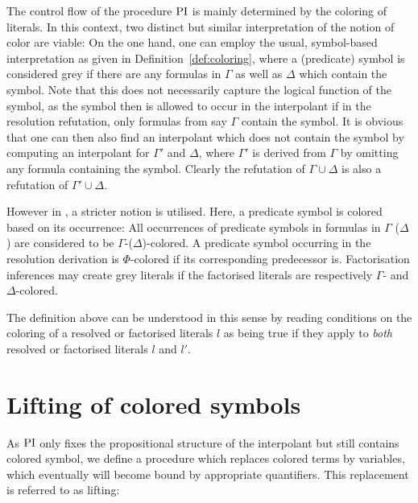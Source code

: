 \begin{remark}
	The control flow of the procedure $\operatorname{PI}$ is mainly determined by the coloring of literals.
	In this context, two distinct but similar interpretation of the notion of color are viable: 
	On the one hand, one can employ the usual, symbol-based interpretation as given in Definition~\ref{def:coloring}, where a (predicate) symbol is considered grey if there are any formulas in $\Gamma$ as well as $\Delta$ which contain the symbol. 
	Note that this does not necessarily capture the logical function of the symbol, as the symbol then is allowed to occur in the interpolant if in the resolution refutation, only formulas from say $\Gamma$ contain the symbol.
	It is obvious that one can then also find an interpolant which does not contain the symbol by computing an interpolant for $\Gamma'$ and $\Delta$, where $\Gamma'$ is derived from $\Gamma$ by omitting any formula containing the symbol. 
	Clearly the refutation of $\Gamma \cup \Delta$ is also a refutation of $\Gamma' \cup \Delta$.

	However in \cite{Huang95}, a stricter notion is utilised.
	Here, a predicate symbol is colored based on its occurrence:
	All occurrences of predicate symbols in formulas in $\Gamma$ ($\Delta$) are considered to be $\Gamma$-($\Delta$)-colored.
	A predicate symbol occurring in the resolution derivation is $\Phi$-colored if its corresponding predecessor is.
	Factorisation inferences may create grey literals if the factorised literals are respectively $\Gamma$- and $\Delta$-colored.

	The definition above can be understood in this sense by reading conditions on the coloring of a resolved or factorised literals $l$ as being true if they apply to \emph{both} resolved or factorised literals $l$ and $l'$.
\end{remark}


\section{Lifting of colored symbols}
\label{sec:lifting}
As $\operatorname{PI}$ only fixes the propositional structure of the interpolant but still contains colored symbol, 
we define a procedure which replaces colored terms by variables, which eventually will become bound by appropriate quantifiers.
This replacement is referred to as lifting:


